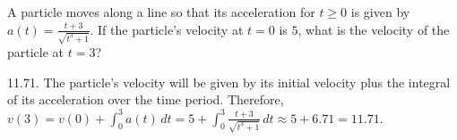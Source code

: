\begin{Exercise} A particle moves along a 
line so that its acceleration for $t \geq 0$ is given by $a(t) = \frac{t + 3}{
\sqrt{t^3 + 1}}$. If the particle's velocity at $t = 0$ is $5$, what is the 
velocity of the particle at $t = 3$?
\end{Exercise}

\begin{Answer}[ref = defint7]
11.71. The particle's velocity will be given by its initial velocity plus the 
integral of its acceleration over the time period. Therefore, $v(3) = v(0) + 
\int_0^3 a(t)\,dt = 5 + \int_0^3 \frac{t + 3}{\sqrt{t^3 + 1}}\,dt \approx 5 + 
6.71 = 11.71$. 
\end{Answer}


